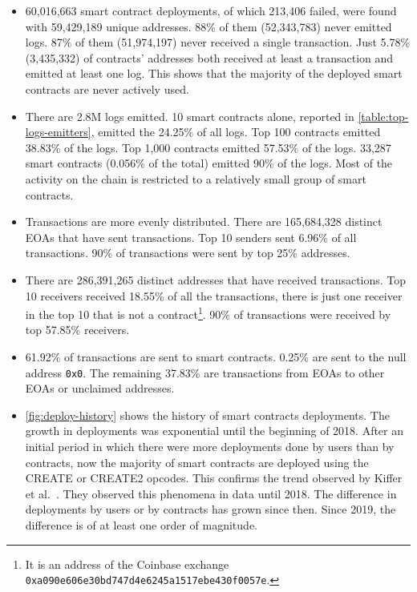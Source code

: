 \begin{itemize}
    \item 60,016,663 smart contract deployments, of which 213,406 failed, were found with 59,429,189 unique addresses. 88\% of them (52,343,783) never emitted logs. 87\% of them (51,974,197) never received a single transaction. Just 5.78\% (3,435,332) of contracts' addresses both received at least a transaction and emitted at least one log. This shows that the majority of the deployed smart contracts are never actively used.
    
    \item There are 2.8M logs emitted. 10 smart contracts alone, reported in \cref{table:top-logs-emitters}, emitted the 24.25\% of all logs. Top 100 contracts emitted 38.83\% of the logs. Top 1,000 contracts emitted 57.53\% of the logs. 33,287 smart contracts (0.056\% of the total) emitted 90\% of the logs. Most of the activity on the chain is restricted to a relatively small group of smart contracts.
    
    \item Transactions are more evenly distributed. There are 165,684,328 distinct EOAs that have sent transactions. Top 10 senders sent 6.96\% of all transactions. 90\% of transactions were sent by top 25\% addresses. 
    
    \item There are 286,391,265 distinct addresses that have received transactions. Top 10 receivers received 18.55\% of all the transactions, there is just one receiver in the top 10 that is not a contract\footnote{It is an address of the Coinbase exchange {\tt 0xa090e606e30bd747d4e6245a1517ebe430f0057e}.}. 90\% of transactions were received by top 57.85\% receivers.
    
    \item 61.92\% of transactions are sent to smart contracts. 0.25\% are sent to the null address {\tt 0x0}. The remaining 37.83\% are transactions from EOAs to other EOAs or unclaimed addresses.
    
    \item \cref{fig:deploy-history} shows the history of smart contracts deployments. The growth in deployments was exponential until the beginning of 2018. After an initial period in which there were more deployments done by users than by contracts, now the majority of smart contracts are deployed using the CREATE or CREATE2 opcodes. This confirms the trend observed by Kiffer et al.~\cite{ethereum-sc-topology}. They observed this phenomena in data until 2018. The difference in deployments by users or by contracts has grown since then. Since 2019, the difference is of at least one order of magnitude.
\end{itemize}

